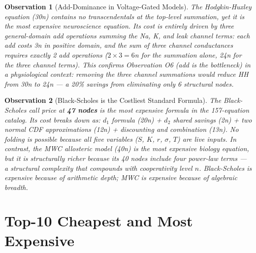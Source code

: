 \documentclass[12pt,a4paper]{article}
\newtheorem{observation}{Observation}[section]
\theoremstyle{definition}
\begin{document}
\begin{observation}[Add-Dominance in Voltage-Gated Models]
\label{obs:O14}
The Hodgkin-Huxley equation (30n) contains no transcendentals at the
top-level summation, yet it is the most expensive neuroscience equation.
Its cost is entirely driven by three general-domain add operations summing
the Na, K, and leak channel terms: each add costs 3n in positive domain,
and the sum of three channel conductances requires exactly 2 add operations
($2 \times 3 = 6$n for the summation alone, 24n for the three channel terms).
This confirms Observation O6 (add is the bottleneck) in a physiological context:
removing the three channel summations would reduce HH from 30n to 24n ---
a 20\% savings from eliminating only 6 structural nodes.
\end{observation}

\begin{observation}[Black-Scholes is the Costliest Standard Formula]
\label{obs:O15}
The Black-Scholes call price at \textbf{47 nodes} is the most expensive
formula in the 157-equation catalog.  Its cost breaks down as:
$d_1$ formula (20n) + $d_2$ shared savings (2n) + two normal CDF
approximations (12n) + discounting and combination (13n).
No folding is possible because all five variables ($S$, $K$, $r$,
$\sigma$, $T$) are live inputs.
In contrast, the MWC allosteric model (40n) is the most expensive biology
equation, but it is structurally richer because its 40 nodes include
four power-law terms --- a structural complexity that compounds with
cooperativity level $n$.
Black-Scholes is expensive because of arithmetic depth; MWC is expensive
because of algebraic breadth.
\end{observation}

\section{Top-10 Cheapest and Most Expensive}
\label{sec:extremes}
\end{document}
